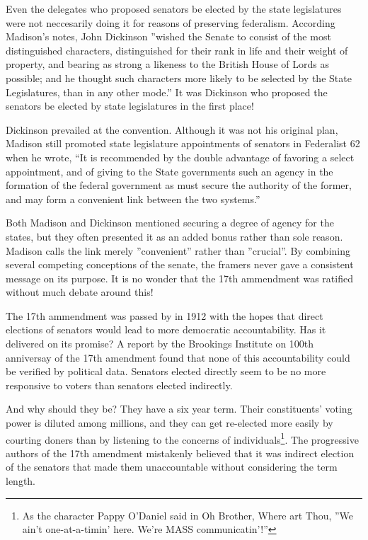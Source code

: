 \documentclass{article}
\begin{document}
Even the delegates who proposed senators be elected by the state legislatures were not neccesarily doing it for reasons of preserving federalism. According Madison's notes, John Dickinson ”wished the Senate to consist of the most distinguished characters, distinguished for their rank in life and their weight of property, and bearing as strong a likeness to the British House of Lords as possible; and he thought such characters more likely to be selected by the State Legislatures, than in any other mode.” It was Dickinson who proposed the senators be elected by state legislatures in the first place!

Dickinson prevailed at the convention. Although it was not his original plan, Madison still promoted state legislature appointments of senators in Federalist 62 when he wrote, “It is recommended by the double advantage of favoring a select appointment, and of giving to the State governments such an agency in the formation of the federal government as must secure the authority of the former, and may form a convenient link between the two systems.”\cite{Federalist62}

Both Madison and Dickinson mentioned securing a degree of agency for the states, but they often presented it as an added bonus rather than sole reason. Madison calls the link merely ”convenient” rather than ”crucial”. By combining several competing conceptions of the senate, the framers never gave a consistent message on its purpose. It is no wonder that the 17th ammendment was ratified without much debate around this!

The 17th ammendment was passed by in 1912 with the hopes that direct elections of senators would lead to more democratic accountability\cite{Eisinger}. Has it delivered on its promise? A report by the Brookings Institute on 100th anniversay of the 17th amendment found that none of this accountability could be verified by political data\cite{Schiller}. Senators elected directly seem to be no more responsive to voters than senators elected indirectly.

And why should they be? They have a six year term. Their constituents' voting power is diluted among millions, and they can get re-elected more easily by courting doners than by listening to the concerns of individuals\footnote{As the character Pappy O'Daniel said in Oh Brother, Where art Thou, ”We ain't one-at-a-timin' here. We're MASS communicatin'!”}. The progressive authors of the 17th amendment mistakenly believed that it was indirect election of the senators that made them unaccountable without considering the term length.
\end{document}
